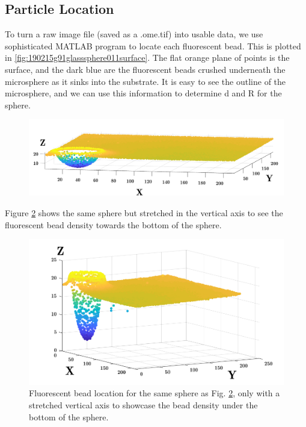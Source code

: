 \subsection{Particle Location}
To turn a raw image file (saved as a .ome.tif) into usable data, we use sophisticated MATLAB program to locate each fluorescent bead. This is plotted in \ref{fig:190215g91glasssphere011surface}. The flat orange plane of points is the surface, and the dark blue are the fluorescent beads crushed underneath the microsphere as it sinks into the substrate. It is easy to see the outline of the microsphere, and we can use this information to determine d and R for the sphere. 
\begin{figure}[h!]
	\centering
	\includegraphics[width=\linewidth]{Chapters/Figures/sphere011_ia/particle_located_normalized}
	\caption[Particle Located: Normalized-Axes]{}
	\label{fig:particlelocatednormalized}
\end{figure}
Figure \ref{fig:particlelocatedstretched} shows the same sphere but stretched in the vertical axis to see the fluorescent bead density towards the bottom of the sphere. 

\begin{figure}[h!]
	\centering
	\includegraphics[width=\linewidth]{Chapters/Figures/sphere011_ia/particle_located_stretched}
	\caption[Particle Located: Stretched-Axes]{Fluorescent bead location for the same sphere as Fig.  \ref{fig:particlelocatedstretched}, only with a stretched vertical axis to showcase the bead density under the bottom of the sphere.}
	\label{fig:particlelocatedstretched}
\end{figure}

